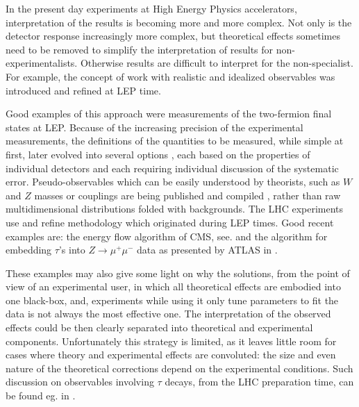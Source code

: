 \documentclass[]{Tauola_interface_design}
\begin{document}
In the present day experiments at High Energy Physics accelerators, 
interpretation of the results is  becoming more and more complex. 
Not only is the detector response increasingly more
complex, but theoretical effects sometimes need to be 
removed to simplify the
interpretation of results for non-experimentalists. 
Otherwise results are difficult to interpret for 
the non-specialist. For example,
the concept of work with realistic and idealized observables 
was  introduced and refined at LEP time. 


Good examples of 
this approach  were measurements of the two-fermion final states at LEP.  
Because of the increasing  precision of the experimental measurements, the definitions of 
the quantities to be measured, while simple at first, later evolved into 
several options \cite{Kobel:2000aw},
each based on the properties of individual detectors and each requiring individual discussion of the systematic 
error.
Pseudo-observables which can be easily
understood by theorists, such as $W$ and $Z$ masses  or couplings are
being published and compiled \cite{Amsler:2008zzb}, rather than raw multidimensional 
distributions folded with backgrounds. 
The LHC experiments
use and refine  methodology which originated during LEP times. 
Good recent examples are:
the energy flow algorithm of CMS, see. \cite{Chatrchyan:2011nx} 
and the algorithm for embedding $\tau$'s into 
$Z \to \mu^+\mu^-$ data as presented
by ATLAS in \cite{Aad:2011rv}.


These examples may also give some light on why the solutions, from the
point of view of an experimental user, in which
all   theoretical effects are embodied into one 
 black-box, 
and, experiments while using it only tune parameters  to fit the data
is not always the most effective one.  The interpretation of the observed effects
could be then clearly separated into theoretical and experimental components.
Unfortunately this strategy is limited, as it leaves little room 
for cases where 
theory and experimental effects are convoluted: the size and even nature of the theoretical corrections 
depend on the experimental conditions. Such discussion on observables 
involving $\tau$ decays, from the  LHC preparation time,
 can be found eg. in \cite{RichterWas:2004jf}.
\end{document}
